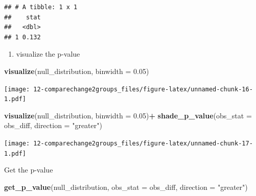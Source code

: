 \documentclass[
]{book}
\newenvironment{Shaded}{\begin{snugshade}}{\end{snugshade}}
\newcommand{\DataTypeTok}[1]{\textcolor[rgb]{0.13,0.29,0.53}{#1}}
\newcommand{\FloatTok}[1]{\textcolor[rgb]{0.00,0.00,0.81}{#1}}
\newcommand{\KeywordTok}[1]{\textcolor[rgb]{0.13,0.29,0.53}{\textbf{#1}}}
\newcommand{\NormalTok}[1]{#1}
\newcommand{\OperatorTok}[1]{\textcolor[rgb]{0.81,0.36,0.00}{\textbf{#1}}}
\newcommand{\StringTok}[1]{\textcolor[rgb]{0.31,0.60,0.02}{#1}}
\providecommand{\tightlist}{%
  \setlength{\itemsep}{0pt}\setlength{\parskip}{0pt}}
\begin{document}
\begin{Shaded}
\end{Shaded}

\begin{verbatim}
## # A tibble: 1 x 1
##    stat
##   <dbl>
## 1 0.132
\end{verbatim}

\begin{enumerate}
\def\labelenumi{\arabic{enumi}.}
\setcounter{enumi}{2}
\tightlist
\item
  visualize the p-value
\end{enumerate}

\begin{Shaded}
\begin{Highlighting}[]
\KeywordTok{visualize}\NormalTok{(null_distribution, }\DataTypeTok{binwidth =} \FloatTok{0.05}\NormalTok{)}
\end{Highlighting}
\end{Shaded}

\texttt{[image: 12-comparechange2groups\_files/figure-latex/unnamed-chunk-16-1.pdf]}

\begin{Shaded}
\begin{Highlighting}[]
\KeywordTok{visualize}\NormalTok{(null_distribution, }\DataTypeTok{binwidth =} \FloatTok{0.05}\NormalTok{)}\OperatorTok{+}\StringTok{ }
\StringTok{  }\KeywordTok{shade_p_value}\NormalTok{(}\DataTypeTok{obs_stat =}\NormalTok{ obs_diff, }\DataTypeTok{direction =} \StringTok{"greater"}\NormalTok{)}
\end{Highlighting}
\end{Shaded}

\texttt{[image: 12-comparechange2groups\_files/figure-latex/unnamed-chunk-17-1.pdf]}

Get the p-value

\begin{Shaded}
\begin{Highlighting}[]
\KeywordTok{get_p_value}\NormalTok{(null_distribution, }\DataTypeTok{obs_stat =}\NormalTok{ obs_diff, }\DataTypeTok{direction =} \StringTok{"greater"}\NormalTok{)}
\end{Highlighting}
\end{Shaded}
\end{document}
